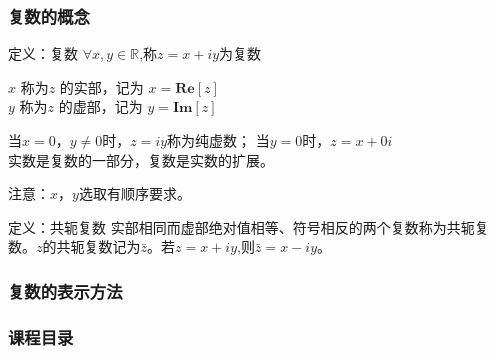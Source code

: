 \documentclass{beamer}
\begin{document}
%
%
\begin{frame}[t]
\frametitle{复数的概念}

\begin{alertblock}{定义：复数}
$\forall x, y\in\mathbb{R}$,称$z =x + iy$为复数 
\begin{center}
    $x$ 称为$z$ 的实部，记为 $x = \mathbf{Re}[z]$\\
$y$ 称为$z$ 的虚部，记为 $y =\mathbf{Im}[z]$ \\
\end{center}
\end{alertblock}


当$x=0$，$y \neq 0$时，$z = iy$称为纯虚数；
当$y=0$时，$z = x + 0i$\\
实数是复数的一部分，复数是实数的扩展。 

\begin{center}
\alert{注意：$x$，$y$选取有顺序要求。} 
\end{center}


\begin{alertblock}{定义：共轭复数}
实部相同而虚部绝对值相等、符号相反的两个复数称为共轭复数。$z$的共轭复数记为$\bar{z}$。若$z= x+iy$,则$\bar{z} = x- iy$。

\end{alertblock}

\end{frame}
%
%
\subsubsection{复数的表示方法}

\begin{frame}[t]
\frametitle{课程目录}
\tableofcontents[currentsubsection ] %
\end{frame}
\end{document}
